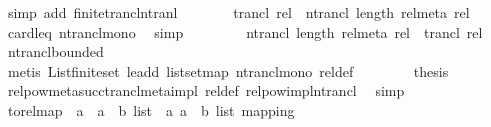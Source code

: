 \begin{isabellebody}
\ {\isacharparenleft}{\kern0pt}simp\ add{\isacharcolon}{\kern0pt}\ finite{\isacharunderscore}{\kern0pt}trancl{\isacharunderscore}{\kern0pt}ntranl{\isacharparenright}{\kern0pt}\isanewline
\ \ \ \ \isamarkupfalse%
\ \isamarkupfalse%
\ {\isachardoublequoteopen}trancl\ rel\ {\isasymsubseteq}\ ntrancl\ {\isacharparenleft}{\kern0pt}length\ rel{\isacharunderscore}{\kern0pt}meta{\isacharparenright}{\kern0pt}\ rel{\isachardoublequoteclose}\ \isamarkupfalse%
\ card{\isacharunderscore}{\kern0pt}leq\ ntrancl{\isacharunderscore}{\kern0pt}mono\ \isamarkupfalse%
\ simp\isanewline
\ \ \isamarkupfalse%
\isanewline
\ \ \ \ \isamarkupfalse%
\ {\isachardoublequoteopen}ntrancl\ {\isacharparenleft}{\kern0pt}length\ rel{\isacharunderscore}{\kern0pt}meta{\isacharparenright}{\kern0pt}\ rel\ {\isasymsubseteq}\ trancl\ rel{\isachardoublequoteclose}\ \isamarkupfalse%
\ ntrancl{\isacharunderscore}{\kern0pt}bounded\isanewline
\ \ \ \ \ \ \isamarkupfalse%
\ {\isacharparenleft}{\kern0pt}metis\ List{\isachardot}{\kern0pt}finite{\isacharunderscore}{\kern0pt}set\ le{\isacharunderscore}{\kern0pt}add{}\ list{\isachardot}{\kern0pt}set{\isacharunderscore}{\kern0pt}map\ ntrancl{\isacharunderscore}{\kern0pt}mono\ rel{\isacharunderscore}{\kern0pt}def{\isacharparenright}{\kern0pt}\isanewline
\ \ \isamarkupfalse%
\isanewline
\ \ \isamarkupfalse%
\ \isamarkupfalse%
\ {\isacharquery}{\kern0pt}thesis\ \isamarkupfalse%
\ relpow{\isacharunderscore}{\kern0pt}meta{\isacharunderscore}{\kern0pt}succ{\isachardot}{\kern0pt}trancl{\isacharunderscore}{\kern0pt}meta{\isacharunderscore}{\kern0pt}impl\ rel{\isacharunderscore}{\kern0pt}def\ relpow{\isacharunderscore}{\kern0pt}impl{\isacharunderscore}{\kern0pt}ntrancl\ \isamarkupfalse%
\ simp\isanewline
{}\isamarkupfalse%
%
\endisatagproof
{\isafoldproof}%
%
\isadelimproof
\isanewline
%
\endisadelimproof
\isanewline
{}\isamarkupfalse%
\isanewline
\isanewline
\isanewline
{}\isamarkupfalse%
\ to{\isacharunderscore}{\kern0pt}rel{\isacharunderscore}{\kern0pt}map\ {\isacharcolon}{\kern0pt}{\isacharcolon}{\kern0pt}\ {\isachardoublequoteopen}{\isacharparenleft}{\kern0pt}{\isacharparenleft}{\kern0pt}{\isacharprime}{\kern0pt}a\ {\isacharasterisk}{\kern0pt}\ {\isacharprime}{\kern0pt}a{\isacharparenright}{\kern0pt}\ {\isacharasterisk}{\kern0pt}\ {\isacharprime}{\kern0pt}b{\isacharparenright}{\kern0pt}\ list\ {\isasymRightarrow}\ {\isacharparenleft}{\kern0pt}{\isacharprime}{\kern0pt}a{\isacharcomma}{\kern0pt}\ {\isacharparenleft}{\kern0pt}{\isacharprime}{\kern0pt}a\ {\isacharasterisk}{\kern0pt}\ {\isacharprime}{\kern0pt}b{\isacharparenright}{\kern0pt}\ list{\isacharparenright}{\kern0pt}\ mapping{\isachardoublequoteclose}\ \isanewline

\end{isabellebody}
